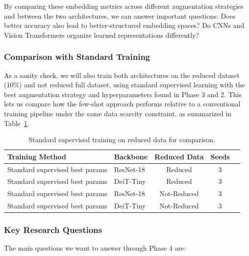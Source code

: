 \documentclass[12pt,a4paper]{article}
\begin{document}
By comparing these embedding metrics across different augmentation strategies and between the two architectures, we can answer important questions: Does better accuracy also lead to better-structured embedding spaces? Do CNNs and Vision Transformers organize learned representations differently?

\subsubsection{Comparison with Standard Training}

As a sanity check, we will also train both architectures on the reduced dataset (10\%) and not reduced full dataset, using standard supervised learning with the best augmentation strategy and hyperparameters found in Phase 3 and 2. This lets us compare how the few-shot approach performs relative to a conventional training pipeline under the same data scarcity constraint, as summarized in Table~\ref{tab:standard_training}.

\begin{table}[H]
\centering
\caption{Standard supervised training on reduced data for comparison.}
\label{tab:standard_training}
\begin{tabular}{@{}llccc@{}}
\toprule
\textbf{Training Method} & \textbf{Backbone} & \textbf{Reduced Data} & \textbf{Seeds} \\
\midrule
Standard supervised best params & ResNet-18 & Reduced & 3 \\
Standard supervised best params & DeiT-Tiny & Reduced & 3 \\
Standard supervised best params & ResNet-18 & Not-Reduced & 3 \\
Standard supervised best params & DeiT-Tiny & Not-Reduced & 3 \\
\bottomrule
\end{tabular}
\end{table}

\subsubsection{Key Research Questions}

The main questions we want to answer through Phase 4 are:
\end{document}
